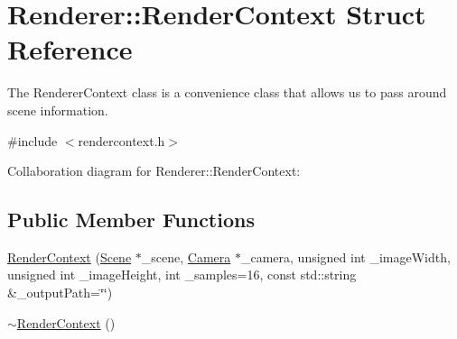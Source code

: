\hypertarget{structRenderer_1_1RenderContext}{}\section{Renderer\+:\+:Render\+Context Struct Reference}
\label{structRenderer_1_1RenderContext}


The Renderer\+Context class is a convenience class that allows us to pass around scene information.  




{\ttfamily \#include $<$rendercontext.\+h$>$}



Collaboration diagram for Renderer\+:\+:Render\+Context\+:
\subsection*{Public Member Functions}
\begin{DoxyCompactItemize}
\item 
\hyperlink{structRenderer_1_1RenderContext_a7e9f3ac4c9560be1057139836739b6c6}{Render\+Context} (\hyperlink{classRenderer_1_1Scene}{Scene} $\ast$\+\_\+scene, \hyperlink{classRenderer_1_1Camera}{Camera} $\ast$\+\_\+camera, unsigned int \+\_\+image\+Width, unsigned int \+\_\+image\+Height, int \+\_\+samples=16, const std\+::string \&\+\_\+output\+Path=\char`\"{}\char`\"{})
\item 
\hyperlink{structRenderer_1_1RenderContext_a0e29c5ebfeb166a4243b645acbd44bd8}{$\sim$\+Render\+Context} ()
\end{DoxyCompactItemize}
